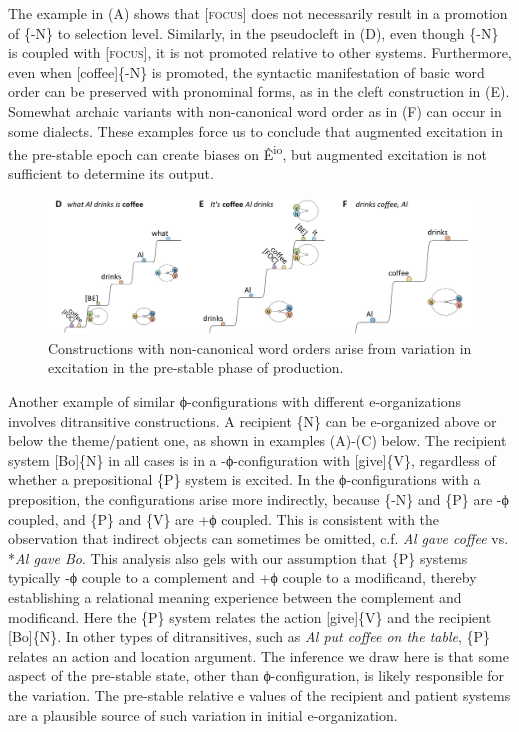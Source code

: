  The example in {}(A) shows that [\textsc{focus}] does not necessarily result in a promotion of \{-N\} to selection level. Similarly, in the pseudocleft in (D), even though \{-N\} is coupled with [\textsc{focus}], it is not promoted relative to other systems. Furthermore, even when [coffee]\{-N\} is promoted, the syntactic manifestation of basic word order can be preserved with pronominal forms, as in the cleft construction in {}(E). Somewhat archaic variants with non-canonical word order as in (F) can occur in some dialects. These examples force us to conclude that augmented excitation in the pre-stable epoch can create biases on Ê\textsuperscript{io}, but augmented excitation is not sufficient to determine its output. 

  
\begin{figure}
\includegraphics[width=\textwidth]{figures/Tilsen-img79.png}
\caption{Constructions with non-canonical word orders arise from variation in excitation in the pre-stable phase of production.}
\label{fig:4:29}
\end{figure}
 

  Another example of similar ϕ-configurations with different e-organizations involves ditransitive constructions. A recipient \{N\} can be e-organized above or below the theme/patient one, as shown in examples (A)-(C) below. The recipient system [Bo]\{N\} in all cases is in a -ϕ-configuration with [give]\{V\}, regardless of whether a prepositional \{P\} system is excited. In the ϕ-configurations with a preposition, the configurations arise more indirectly, because \{-N\} and \{P\} are -ϕ coupled, and \{P\} and \{V\} are +ϕ coupled. This is consistent with the observation that indirect objects can sometimes be omitted, c.f. \textit{Al gave coffee} vs. *\textit{Al gave Bo}. This analysis also gels with our assumption that \{P\} systems typically -ϕ couple to a complement and +ϕ couple to a modificand, thereby establishing a relational meaning experience between the complement and modificand. Here the \{P\} system relates the action [give]\{V\} and the recipient [Bo]\{N\}. In other types of ditransitives, such as \textit{Al put coffee on the table}, \{P\} relates an action and location argument. The inference we draw here is that some aspect of the pre-stable state, other than ϕ-configuration, is likely responsible for the variation. The pre-stable relative e values of the recipient and patient systems are a plausible source of such variation in initial e-organization.

